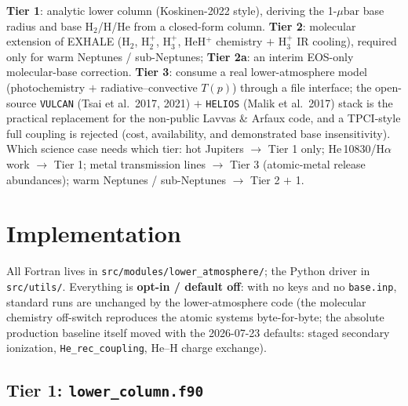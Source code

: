 \documentclass[english,a4paper]{my_memo}
\newcommand{\ubar}{\mu\mathrm{bar}}
\begin{document}
\textbf{Tier 1}: analytic lower column (Koskinen-2022 style), deriving the 1-$\ubar$ base
radius and base H$_2$/H/He from a closed-form column. \textbf{Tier 2}: molecular
extension of EXHALE (H$_2$, H$_2^+$, H$_3^+$, HeH$^+$ chemistry $+$ H$_3^+$ IR cooling),
required only for warm Neptunes / sub-Neptunes; \textbf{Tier 2a}: an interim EOS-only
molecular-base correction. \textbf{Tier 3}: consume a real lower-atmosphere model
(photochemistry $+$ radiative--convective $T(p)$) through a file interface; the
open-source \texttt{VULCAN} (Tsai et al.\ 2017, 2021) $+$ \texttt{HELIOS} (Malik et al.\
2017) stack is the practical replacement for the non-public Lavvas \& Arfaux code, and a
TPCI-style full coupling is rejected (cost, availability, and demonstrated base
insensitivity). Which science case needs which tier: hot Jupiters $\to$ Tier 1 only;
He\,10830/H$\alpha$ work $\to$ Tier 1; metal transmission lines $\to$ Tier 3 (atomic-metal
release abundances); warm Neptunes / sub-Neptunes $\to$ Tier 2 $+$ 1.

\section{Implementation}\label{sec:impl}

All Fortran lives in \texttt{src/modules/lower\_atmosphere/}; the Python driver in
\texttt{src/utils/}. Everything is \textbf{opt-in / default off}: with no keys and no
\texttt{base.inp}, standard runs are unchanged by the lower-atmosphere code (the
molecular chemistry off-switch reproduces the atomic systems byte-for-byte; the
absolute production baseline itself moved with the 2026-07-23 defaults: staged
secondary ionization, \texttt{He\_rec\_coupling}, He--H charge exchange).

\subsection{Tier 1: \texttt{lower\_column.f90}}\label{sub:t1}
\end{document}
